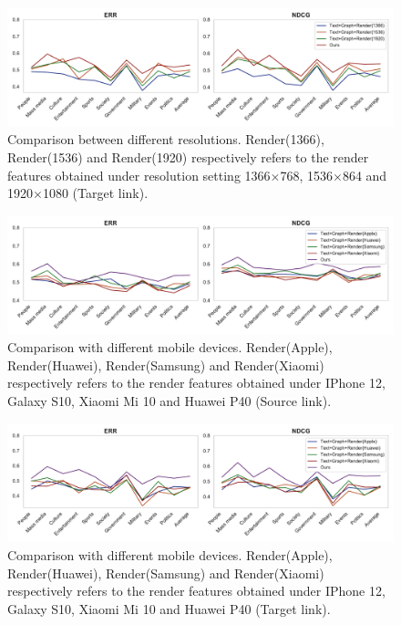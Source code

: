 \begin{figure}[t]
\centering
\includegraphics[width=1\textwidth]{exp_tab3_tgt}
\caption{Comparison between different resolutions. Render(1366), Render(1536) and Render(1920) respectively refers to the render features obtained under resolution setting 1366$\times$768, 1536$\times$864 and 1920$\times$1080 (Target link).}
\label{table_cmp6}
\end{figure}

\begin{figure}[t]
\centering
\includegraphics[width=1\textwidth]{exp_tab4_src}
\caption{Comparison with different mobile devices. Render(Apple), Render(Huawei), Render(Samsung) and Render(Xiaomi) respectively refers to the render features obtained under IPhone 12, Galaxy S10, Xiaomi Mi 10 and Huawei P40 (Source link).}
\label{table_cmp7}
\end{figure}

\begin{figure}[t]
\centering
\includegraphics[width=1\textwidth]{exp_tab4_tgt}
\caption{Comparison with different mobile devices. Render(Apple), Render(Huawei), Render(Samsung) and Render(Xiaomi) respectively refers to the render features obtained under IPhone 12, Galaxy S10, Xiaomi Mi 10 and Huawei P40 (Target link).}
\label{table_cmp8}
\end{figure}

